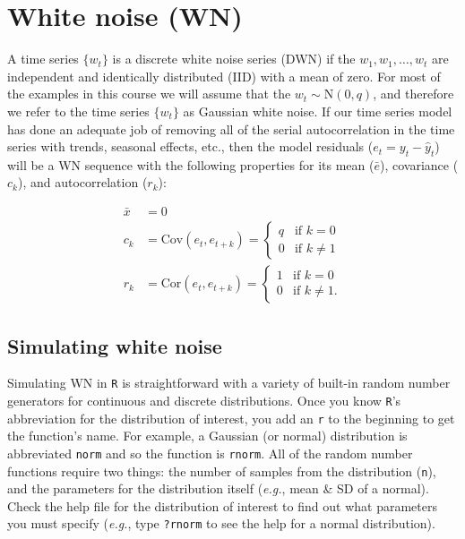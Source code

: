 \section{White noise (WN)}

A time series $\{w_t\}$ is a discrete white noise series (DWN) if the $w_1, w_1, \dots, w_t$ are independent and identically distributed (IID) with a mean of zero. For most of the examples in this course we will assume that the $w_t \sim \text{N}(0,q)$, and therefore we refer to the time series $\{w_t\}$ as Gaussian white noise.  If our time series model has done an adequate job of removing all of the serial autocorrelation in the time series with trends, seasonal effects, etc., then the model residuals ($e_t = y_t - \hat{y}_t$) will be a WN sequence with the following properties for its mean ($\bar{e}$), covariance ($c_k$), and autocorrelation ($r_k$):

\begin{equation}\label{eqn:WNprops}
  \begin{aligned}
    \bar{x} &= 0 \\
    c_k &= \text{Cov}(e_t,e_{t+k}) = \begin{cases}
            q & \text{if } k = 0 \\
            0 & \text{if } k \neq 1
          \end{cases} \\
    r_k &= \text{Cor}(e_t,e_{t+k}) = \begin{cases}
            1 & \text{if } k = 0 \\
            0 & \text{if } k \neq 1.
          \end{cases}
  \end{aligned}
\end{equation}

\subsection{Simulating white noise}

Simulating WN in \texttt{R} is straightforward with a variety of built-in random number generators for continuous and discrete distributions.  Once you know \texttt{R}'s abbreviation for the distribution of interest, you add an \texttt{r} to the beginning to get the function's name.  For example, a Gaussian (or normal) distribution is abbreviated \texttt{norm} and so the function is \texttt{rnorm}.  All of the random number functions require two things: the number of samples from the distribution (\texttt{n}), and the parameters for the distribution itself (\emph{e.g.}, mean \& SD of a normal).  Check the help file for the distribution of interest to find out what parameters you must specify (\emph{e.g.}, type \texttt{?rnorm} to see the help for a normal distribution).

